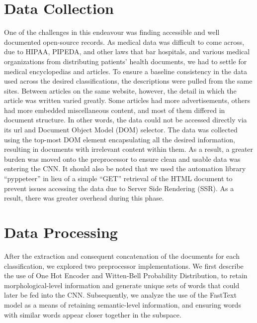 \documentclass[12pt]{report}
\begin{document}
\section{Data Collection}
One of the challenges in this endeavour was finding accessible and well
documented open-source records. As medical data was difficult to come across, due
to HIPAA, PIPEDA, and other laws that bar hospitals, and various medical
organizations from distributing patients' health documents, we had to settle
for medical encyclopedias and articles. To ensure a baseline consistency in the data used across
the desired classifications, the descriptions were pulled from the same sites.
Between articles on the same website, however, the detail in which the article
was written varied greatly. Some articles had more advertisements, others had
more embedded miscellaneous content, and most of them differed in document
structure. In other words, the data could not be accessed directly via its url
and Document Object Model (DOM) selector. The data was collected using the top-most DOM element
encapsulating all the desired information, resulting in documents with
irrelevant content within them.  As a result, a greater burden was moved onto
the preprocessor to ensure clean and usable data was entering the CNN. It
should also be noted that we used the automation library “pyppeteer” in lieu of
a simple “GET” retrieval of the HTML document to prevent issues accessing the
data due to Server Side Rendering (SSR). As a result, there was greater
overhead during this phase.

\section{Data Processing}
After the extraction and consequent concatenation of the documents for each
classification, we explored two preprocessor implementations. We first describe
the use of One Hot Encoder\cite{scikit-learn} and Witten-Bell Probability Distribution\cite{bird2009natural}, to retain
morphological-level information and generate unique sets of words that could
later be fed into the CNN. Subsequently, we analyze the use of the FastText\cite{rehurek2011gensim}
model as a means of retaining semantic-level information, and ensuring words
with similar words appear closer together in the subspace.
\end{document}
